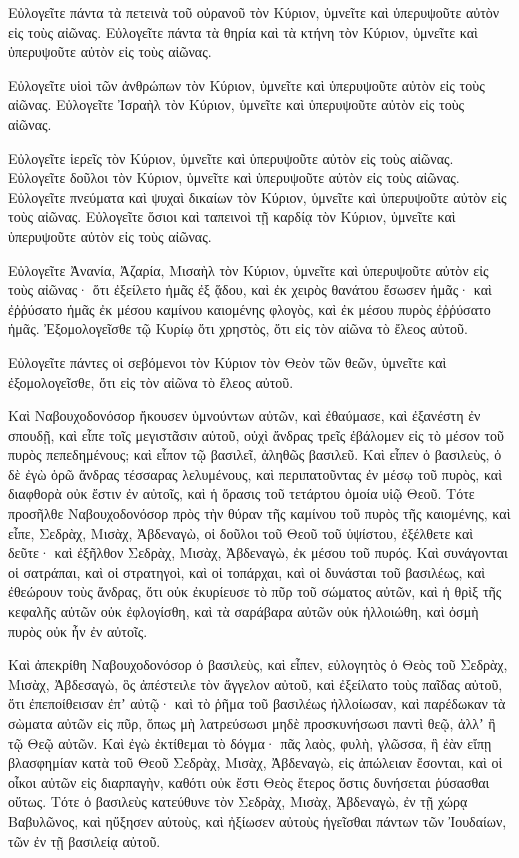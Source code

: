{Εὐλογεῖτε πάντα τὰ πετεινὰ τοῦ οὐρανοῦ τὸν Κύριον, ὑμνεῖτε καὶ ὑπερυψοῦτε αὐτὸν εἰς τοὺς αἰῶνας.
Εὐλογεῖτε πάντα τὰ θηρία καὶ τὰ κτήνη τὸν Κύριον, ὑμνεῖτε καὶ ὑπερυψοῦτε αὐτὸν εἰς τοὺς αἰῶνας.
\par }{\PP {}Εὐλογεῖτε υἱοὶ τῶν ἀνθρώπων τὸν Κύριον, ὑμνεῖτε καὶ ὑπερυψοῦτε αὐτὸν εἰς τοὺς αἰῶνας.
Εὐλογεῖτε Ἰσραὴλ τὸν Κύριον, ὑμνεῖτε καὶ ὑπερυψοῦτε αὐτὸν εἰς τοὺς αἰῶνας.
\par }{\PP {}Εὐλογεῖτε ἱερεῖς τὸν Κύριον, ὑμνεῖτε καὶ ὑπερυψοῦτε αὐτὸν εἰς τοὺς αἰῶνας.
Εὐλογεῖτε δοῦλοι τὸν Κύριον, ὑμνεῖτε καὶ ὑπερυψοῦτε αὐτὸν εἰς τοὺς αἰῶνας.
Εὐλογεῖτε πνεύματα καὶ ψυχαὶ δικαίων τὸν Κύριον, ὑμνεῖτε καὶ ὑπερυψοῦτε αὐτὸν εἰς τοὺς αἰῶνας.
Εὐλογεῖτε ὅσιοι καὶ ταπεινοὶ τῇ καρδίᾳ τὸν Κύριον, ὑμνεῖτε καὶ ὑπερυψοῦτε αὐτὸν εἰς τοὺς αἰῶνας.
\par }{\PP {}Εὐλογεῖτε Ἀνανία, Ἀζαρία, Μισαὴλ τὸν Κύριον, ὑμνεῖτε καὶ ὑπερυψοῦτε αὐτὸν εἰς τοὺς αἰῶνας· ὅτι ἐξείλετο ἡμᾶς ἐξ ᾅδου, καὶ ἐκ χειρὸς θανάτου ἔσωσεν ἡμᾶς· καὶ ἐῤῥύσατο ἡμᾶς ἐκ μέσου καμίνου καιομένης φλογὸς, καὶ ἐκ μέσου πυρὸς ἐῤῥύσατο ἡμᾶς.
Ἐξομολογεῖσθε τῷ Κυρίῳ ὅτι χρηστὸς, ὅτι εἰς τὸν αἰῶνα τὸ ἔλεος αὐτοῦ.
\par }{\PP {}Εὐλογεῖτε πάντες οἱ σεβόμενοι τὸν Κύριον τὸν Θεὸν τῶν θεῶν, ὑμνεῖτε καὶ ἐξομολογεῖσθε, ὅτι εἰς τὸν αἰῶνα τὸ ἔλεος αὐτοῦ.
\par }{\PP {}Καὶ Ναβουχοδονόσορ ἤκουσεν ὑμνούντων αὐτῶν, καὶ ἐθαύμασε, καὶ ἐξανέστη ἐν σπουδῇ, καὶ εἶπε τοῖς μεγιστᾶσιν αὐτοῦ, οὐχὶ ἄνδρας τρεῖς ἐβάλομεν εἰς τὸ μέσον τοῦ πυρὸς πεπεδημένους; καὶ εἶπον τῷ βασιλεῖ, ἀληθῶς βασιλεῦ.
Καὶ εἶπεν ὁ βασιλεὺς, ὁ δὲ ἐγὼ ὁρῶ ἄνδρας τέσσαρας λελυμένους, καὶ περιπατοῦντας ἐν μέσῳ τοῦ πυρὸς, καὶ διαφθορὰ οὐκ ἔστιν ἐν αὐτοῖς, καὶ ἡ ὅρασις τοῦ τετάρτου ὁμοία υἱῷ Θεοῦ.
Τότε προσῆλθε Ναβουχοδονόσορ πρὸς τὴν θύραν τῆς καμίνου τοῦ πυρὸς τῆς καιομένης, καὶ εἶπε, Σεδρὰχ, Μισὰχ, Ἀβδεναγὼ, οἱ δοῦλοι τοῦ Θεοῦ τοῦ ὑψίστου, ἐξέλθετε καὶ δεῦτε· καὶ ἐξῆλθον Σεδρὰχ, Μισὰχ, Ἀβδεναγὼ, ἐκ μέσου τοῦ πυρός.
Καὶ συνάγονται οἱ σατράπαι, καὶ οἱ στρατηγοὶ, καὶ οἱ τοπάρχαι, καὶ οἱ δυνάσται τοῦ βασιλέως, καὶ ἐθεώρουν τοὺς ἄνδρας, ὅτι οὐκ ἐκυρίευσε τὸ πῦρ τοῦ σώματος αὐτῶν, καὶ ἡ θρὶξ τῆς κεφαλῆς αὐτῶν οὐκ ἐφλογίσθη, καὶ τὰ σαράβαρα αὐτῶν οὐκ ἠλλοιώθη, καὶ ὀσμὴ πυρὸς οὐκ ἦν ἐν αὐτοῖς.
\par }{\PP {}Καὶ ἀπεκρίθη Ναβουχοδονόσορ ὁ βασιλεὺς, καὶ εἶπεν, εὐλογητὸς ὁ Θεὸς τοῦ Σεδρὰχ, Μισὰχ, Ἀβδεσαγὼ, ὃς ἀπέστειλε τὸν ἄγγελον αὐτοῦ, καὶ ἐξείλατο τοὺς παῖδας αὐτοῦ, ὅτι ἐπεποίθεισαν ἐπʼ αὐτῷ· καὶ τὸ ῥῆμα τοῦ βασιλέως ἠλλοίωσαν, καὶ παρέδωκαν τὰ σὼματα αὐτῶν εἰς πῦρ, ὅπως μὴ λατρεύσωσι μηδὲ προσκυνήσωσι παντὶ θεῷ, ἀλλʼ ἢ τῷ Θεῷ αὐτῶν.
Καὶ ἐγὼ ἐκτίθεμαι τὸ δόγμα· πᾶς λαὸς, φυλὴ, γλῶσσα, ἣ ἐὰν εἴπῃ βλασφημίαν κατὰ τοῦ Θεοῦ Σεδρὰχ, Μισὰχ, Ἀβδεναγὼ, εἰς ἀπώλειαν ἔσονται, καὶ οἱ οἶκοι αὐτῶν εἰς διαρπαγὴν, καθότι οὐκ ἔστι Θεὸς ἕτερος ὅστις δυνήσεται ῥύσασθαι οὕτως.
Τότε ὁ βασιλεὺς κατεύθυνε τὸν Σεδρὰχ, Μισὰχ, Ἀβδεναγὼ, ἐν τῇ χώρᾳ Βαβυλῶνος, καὶ ηὔξησεν αὐτοὺς, καὶ ἠξίωσεν αὐτοὺς ἡγεῖσθαι πάντων τῶν Ἰουδαίων, τῶν ἐν τῇ βασιλείᾳ αὐτοῦ.

}
